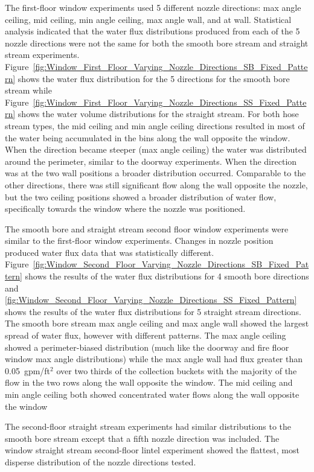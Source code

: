 \documentclass[12pt,oneside]{book}
\begin{document}
\clearpage

The first-floor window experiments used 5 different nozzle directions: max angle ceiling, mid ceiling, min angle ceiling, max angle wall, and at wall. Statistical analysis indicated that the water flux distributions produced from each of the 5 nozzle directions were not the same for both the smooth bore stream and straight stream experiments. Figure~\ref{fig:Window_First_Floor_Varying_Nozzle_Directions_SB_Fixed_Pattern} shows the water flux distribution for the 5 directions for the smooth bore stream while Figure~\ref{fig:Window_First_Floor_Varying_Nozzle_Directions_SS_Fixed_Pattern} shows the water volume distributions for the straight stream. For both hose stream types, the mid ceiling and min angle ceiling directions resulted in most of the water being accumulated in the bins along the wall opposite the window. When the direction became steeper (max angle ceiling) the water was distributed around the perimeter, similar to the doorway experiments. When the direction was at the two wall positions a broader distribution occurred. Comparable to the other directions, there was still significant flow along the wall opposite the nozzle, but the two ceiling positions showed a broader distribution of water flow, specifically towards the window where the nozzle was positioned.

The smooth bore and straight stream second floor window experiments were similar to the first-floor window experiments. Changes in nozzle position produced water flux data that was statistically different. Figure~\ref{fig:Window_Second_Floor_Varying_Nozzle_Directions_SB_Fixed_Pattern} shows the results of the water flux distributions for 4 smooth bore directions and \ref{fig:Window_Second_Floor_Varying_Nozzle_Directions_SS_Fixed_Pattern} shows the results of the water flux distributions for 5 straight stream directions. The smooth bore stream max angle ceiling and max angle wall showed the largest spread of water flux, however with different patterns. The max angle ceiling showed a perimeter-biased distribution (much like the doorway and fire floor window max angle distributions) while the max angle wall had flux greater than 0.05~gpm/ft$^2$ over two thirds of the collection buckets with the majority of the flow in the two rows along the wall opposite the window. The mid ceiling and min angle ceiling both showed concentrated water flows along the wall opposite the window

The second-floor straight stream experiments had similar distributions to the smooth bore stream except that a fifth nozzle direction was included. The window straight stream second-floor lintel experiment showed the flattest, most disperse distribution of the nozzle directions tested.
\end{document}
